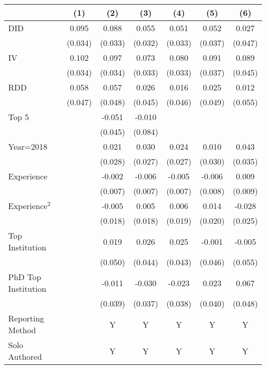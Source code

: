 \begin{tabular}{l*{6}{c}}
\hline\hline
                &\multicolumn{1}{c}{(1)}&\multicolumn{1}{c}{(2)}&\multicolumn{1}{c}{(3)}&\multicolumn{1}{c}{(4)}&\multicolumn{1}{c}{(5)}&\multicolumn{1}{c}{(6)}\\
\hline
DID             &    0.095&    0.088&    0.055&    0.051&    0.052&    0.027\\
                &  (0.034)&  (0.033)&  (0.032)&  (0.033)&  (0.037)&  (0.047)\\
IV              &    0.102&    0.097&    0.073&    0.080&    0.091&    0.089\\
                &  (0.034)&  (0.034)&  (0.033)&  (0.033)&  (0.037)&  (0.045)\\
RDD             &    0.058&    0.057&    0.026&    0.016&    0.025&    0.012\\
                &  (0.047)&  (0.048)&  (0.045)&  (0.046)&  (0.049)&  (0.055)\\
Top 5           &         &   -0.051&   -0.010&         &         &         \\
                &         &  (0.045)&  (0.084)&         &         &         \\
Year=2018       &         &    0.021&    0.030&    0.024&    0.010&    0.043\\
                &         &  (0.028)&  (0.027)&  (0.027)&  (0.030)&  (0.035)\\
Experience      &         &   -0.002&   -0.006&   -0.005&   -0.006&    0.009\\
                &         &  (0.007)&  (0.007)&  (0.007)&  (0.008)&  (0.009)\\
Experience$^2$  &         &   -0.005&    0.005&    0.006&    0.014&   -0.028\\
                &         &  (0.018)&  (0.018)&  (0.019)&  (0.020)&  (0.025)\\
Top Institution &         &    0.019&    0.026&    0.025&   -0.001&   -0.005\\
                &         &  (0.050)&  (0.044)&  (0.043)&  (0.046)&  (0.055)\\
PhD Top Institution&         &   -0.011&   -0.030&   -0.023&    0.023&    0.067\\
                &         &  (0.039)&  (0.037)&  (0.038)&  (0.040)&  (0.048)\\
Reporting Method &         &        Y&        Y&        Y&        Y&        Y\\
Solo Authored   &         &        Y&        Y&        Y&        Y&        Y\\

\end{tabular}
